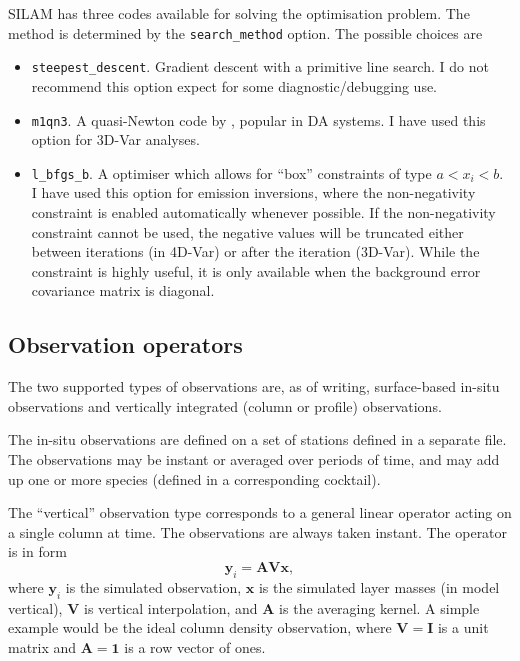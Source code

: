 \documentclass[a4paper]{article}
\begin{document}
SILAM has three codes available for solving the optimisation problem. The method is
determined by the \verb|search_method| option. The possible choices are
\begin{itemize}
\item \verb|steepest_descent|. Gradient descent with a primitive line search. I do not
  recommend this option expect for some diagnostic/debugging use.
\item \verb|m1qn3|. A quasi-Newton code by \citet{Gilbert1989}, popular in DA systems. I
  have used this option for 3D-Var analyses.
\item \verb|l_bfgs_b|. A optimiser which allows for ``box'' constraints of type $a < x_i <
  b$. I have used this option for emission inversions, where the non-negativity constraint
  is enabled automatically whenever possible. If the non-negativity constraint cannot be
  used, the negative values will be truncated either between iterations (in 4D-Var) or
  after the iteration (3D-Var). While the constraint is highly useful, it is only
  available when the background error covariance matrix is diagonal.
\end{itemize}

\subsection{Observation operators}

The two supported types of observations are, as of writing, surface-based in-situ
observations and vertically integrated (column or profile) observations.

The in-situ observations are defined on a set of stations defined in a separate file. The
observations may be instant or averaged over periods of time, and may add up one or more
species (defined in a corresponding cocktail).

The ``vertical'' observation type corresponds to a general linear operator acting on a
single column at time. The observations are always taken instant. The operator is in form
\begin{equation}
\mathbf{y}_i  = \mathbf{A}\mathbf{V} \mathbf{x},
\end{equation}
where $\mathbf{y}_i$ is the simulated observation, $\mathbf{x}$ is the simulated layer
masses (in model vertical), $\mathbf{V}$ is vertical interpolation, and $\mathbf{A}$ is
the averaging kernel. A simple example would be the ideal column density observation,
where $\mathbf{V} = \mathbf{I}$ is a unit matrix and $\mathbf{A} = \mathbf{1}$ is a row
vector of ones.
\end{document}
